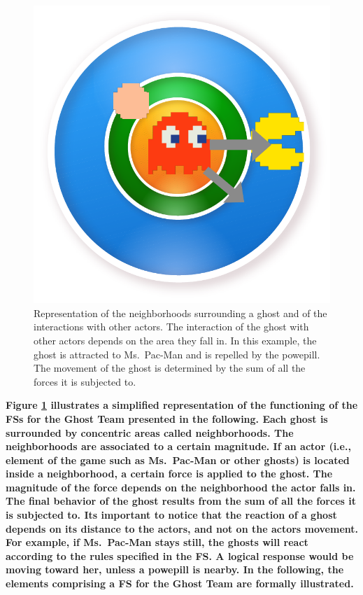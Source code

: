 \documentclass[journal]{IEEEtran}
\begin{document}
\begin{figure}[!t]
  \caption{Representation of the neighborhoods surrounding a ghost and of the interactions with other actors. The interaction of the ghost with other actors depends on the area they fall in. In this example, the ghost is attracted to Ms.\ Pac-Man and is repelled by the powepill. The movement of the ghost is determined by the sum of all the forces it is subjected to.}
  \label{fig:Neigh_interaction}
  \centering
  \includegraphics[scale=0.5]{"neigh_inter"}
\end{figure}

\textbf{Figure \ref{fig:Neigh_interaction} illustrates a simplified representation of the functioning of the FSs for the Ghost Team presented in the following. Each ghost is surrounded by concentric areas called neighborhoods. The neighborhoods are associated to a certain magnitude. If an actor (i.e., element of the game such as Ms.\ Pac-Man or other ghosts) is located inside a neighborhood, a certain force is applied to the ghost. The magnitude of the force depends on the neighborhood the actor falls in. The final behavior of the ghost results from the sum of all the forces it is subjected to. Its important to notice that the reaction of a ghost depends on its distance to the actors, and not on the actors movement. For example, if Ms.\ Pac-Man stays still, the ghosts will react according to the rules specified in the FS. A logical response would be moving toward her, unless a powepill is nearby. In the following, the elements comprising a FS for the Ghost Team are formally illustrated.}
\end{document}
